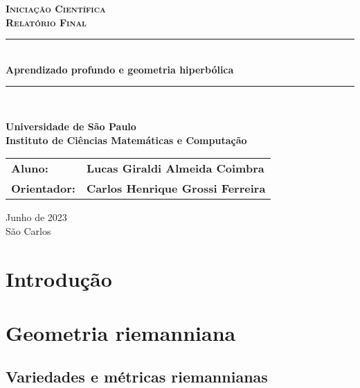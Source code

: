 \documentclass{article}
\begin{document}
\begin{titlepage}
    \center
    \textsc{\textbf{\Large Iniciação Científica}}\\[0.5cm]
    \textsc{\textbf{\large Relatório Final}}\\[0.5cm]
    
    \vspace{4cm}
    
    \rule{\linewidth}{0.5mm}\\[0.4cm]
    {\huge \textbf{Aprendizado profundo e geometria hiperbólica}}
    \rule{\linewidth}{0.5mm}\\[1.0cm]
    
    \vspace{1.0cm}
    
    \textbf{\Large{Universidade de São Paulo}}\\[0.2cm]
    \textbf{\large{Instituto de Ciências Matemáticas e Computação}}
    \vspace{4cm}
    
    \begin{flushright}
        \begin{tabular}{@{}ll@{}}
            \hspace{1cm}\textbf{\large{Aluno:}} & \textbf{\large{Lucas Giraldi Almeida Coimbra}}\\
            \hspace{1cm}\textbf{\large{Orientador:}} & \textbf{\large{Carlos Henrique Grossi Ferreira}}\\
            \end{tabular}
    \end{flushright}
    
    \vfill
    \Large{Junho de 2023}\\[0.2cm]
    \Large{São Carlos}
\end{titlepage}

\newpage

\tableofcontents

\newpage

\section{Introdução}

\section{Geometria riemanniana}

\subsection{Variedades e métricas riemannianas}
\end{document}
